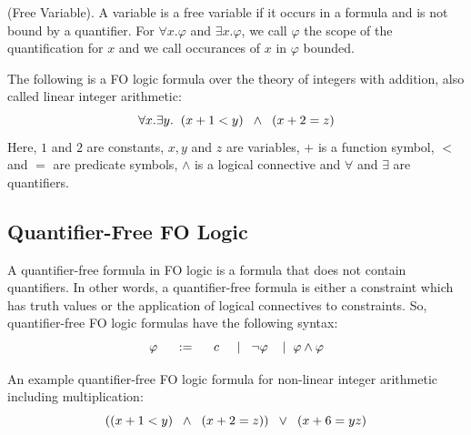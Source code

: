 \begin{definition}
\label{def:Free_Variables}
    (Free Variable).
    A variable is a free variable if it occurs in a formula and is not bound by a quantifier.
    For $\forall x. \varphi$ and $\exists x. \varphi$, we call $\varphi$ the scope of the quantification for $x$ and we call occurances of $x$ in $\varphi$ bounded.
\end{definition}

\begin{example}
    The following is a FO logic formula over the theory of integers with addition, also called linear integer arithmetic:
    $$  \forall x. \exists y. \hspace{2mm} (x + 1 < y) \hspace{2mm} \wedge  \hspace{2mm} (x + 2 = z) $$
    Here, $1$ and $2$ are constants, $x, y$ and $z$ are variables, $+$ is a function symbol, $<$ and $=$ are predicate symbols, $\wedge$ is a logical connective and $\forall$ and $\exists$ are quantifiers.
\end{example}
\subsection{Quantifier-Free FO Logic}
\label{subsec:Quantifire_Free_FO_Logic}
A quantifier-free formula in FO logic is a formula that does not contain quantifiers.
In other words, a quantifier-free formula is either a constraint which has truth values or the application of logical connectives to constraints.
So, quantifier-free FO logic formulas have the following syntax:
$$\varphi\hspace{5mm}:=\hspace{5mm}c\hspace{5mm}|\hspace{3mm}\neg\varphi\hspace{4mm}|\hspace{2mm}\varphi\wedge\varphi$$

\begin{example}
    An example quantifier-free FO logic formula for non-linear integer arithmetic including multiplication:
    $$ ((x + 1 < y) \hspace{2mm} \wedge  \hspace{2mm} (x + 2 = z))  \hspace{2mm} \vee \hspace{2mm} (x + 6 = yz) $$
\end{example}

